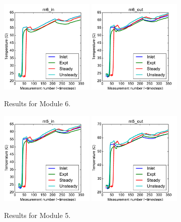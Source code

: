 \documentclass{article}
\begin{document}
\begin{figure}[!ht]
\centering
\includegraphics[width=0.4\textwidth]{../../data/ICSolar/images/Feb6_m6_in_compare.pdf}\hspace{0.05\textwidth}
\includegraphics[width=0.4\textwidth]{../../data/ICSolar/images/Feb6_m6_out_compare.pdf}\hspace{0.05\textwidth}\\
\caption{Results for Module 6.}\end{figure}
\begin{figure}[!ht]
\centering
\includegraphics[width=0.4\textwidth]{../../data/ICSolar/images/Feb6_m5_in_compare.pdf}\hspace{0.05\textwidth}
\includegraphics[width=0.4\textwidth]{../../data/ICSolar/images/Feb6_m5_out_compare.pdf}\hspace{0.05\textwidth}\\
\caption{Results for Module 5.}\end{figure}
\end{document}
